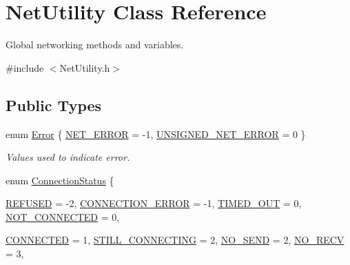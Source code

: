 \hypertarget{class_net_utility}{
\section{NetUtility Class Reference}
\label{class_net_utility}
}


Global networking methods and variables.  




{\ttfamily \#include $<$NetUtility.h$>$}

\subsection*{Public Types}
\begin{DoxyCompactItemize}
\item 
enum \hyperlink{class_net_utility_ae331fb5c7488331b51a881f5e5435ce7}{Error} \{ \hyperlink{class_net_utility_ae331fb5c7488331b51a881f5e5435ce7aa12331fede483c6bcfb76a0b46954028}{NET\_\-ERROR} =  -\/1, 
\hyperlink{class_net_utility_ae331fb5c7488331b51a881f5e5435ce7acca94351eff26d1297605eb211efc997}{UNSIGNED\_\-NET\_\-ERROR} =  0
 \}
\begin{DoxyCompactList}\small\item\em Values used to indicate error. \item\end{DoxyCompactList}\item 
enum \hyperlink{class_net_utility_a7eae52138f8bd597ffc67ebf07e86b6d}{ConnectionStatus} \{ \par
\hyperlink{class_net_utility_a7eae52138f8bd597ffc67ebf07e86b6dabc894c2de7a4404e353f3bcc1193e90b}{REFUSED} =  -\/2, 
\hyperlink{class_net_utility_a7eae52138f8bd597ffc67ebf07e86b6da7c6b34544a99c4c264366f2fed4f0973}{CONNECTION\_\-ERROR} =  -\/1, 
\hyperlink{class_net_utility_a7eae52138f8bd597ffc67ebf07e86b6da319e02f6059b4b08edd70c16fa5206fd}{TIMED\_\-OUT} =  0, 
\hyperlink{class_net_utility_a7eae52138f8bd597ffc67ebf07e86b6daef8b7210b8ae3961e19fcde743ee08af}{NOT\_\-CONNECTED} =  0, 
\par
\hyperlink{class_net_utility_a7eae52138f8bd597ffc67ebf07e86b6da9c07ac24fb9bdd4157ace978968721fd}{CONNECTED} =  1, 
\hyperlink{class_net_utility_a7eae52138f8bd597ffc67ebf07e86b6da86caa623f8ffc60da40df3c2ab17532c}{STILL\_\-CONNECTING} =  2, 
\hyperlink{class_net_utility_a7eae52138f8bd597ffc67ebf07e86b6da1bcc92a56bd754f0e02e33787f7f9e38}{NO\_\-SEND} =  2, 
\hyperlink{class_net_utility_a7eae52138f8bd597ffc67ebf07e86b6dad749d5c33d1f4fda670efe634f651885}{NO\_\-RECV} =  3, 

\end{DoxyCompactItemize}
